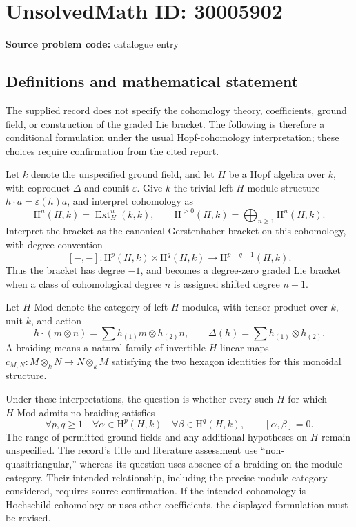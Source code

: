 \documentclass[11pt]{article}
\begin{document}
\section*{UnsolvedMath ID: 30005902}
\textbf{Source problem code:} catalogue entry
\subsection{Definitions and mathematical statement}
The supplied record does not specify the cohomology theory, coefficients, ground field, or construction of the graded Lie bracket. The following is therefore a conditional formulation under the usual Hopf-cohomology interpretation; these choices require confirmation from the cited report.

Let \(k\) denote the unspecified ground field, and let \(H\) be a Hopf algebra over \(k\), with coproduct \(\Delta\) and counit \(\varepsilon\). Give \(k\) the trivial left \(H\)-module structure \(h\cdot a=\varepsilon(h)a\), and interpret cohomology as
\[
\mathrm{H}^{n}(H,k)=\operatorname{Ext}^{n}_{H}(k,k),
\qquad
\mathrm{H}^{>0}(H,k)=\bigoplus_{n\geq 1}\mathrm{H}^{n}(H,k).
\]
Interpret the bracket as the canonical Gerstenhaber bracket on this cohomology, with degree convention
\[
[-,-]\colon \mathrm{H}^{p}(H,k)\times\mathrm{H}^{q}(H,k)
\longrightarrow \mathrm{H}^{p+q-1}(H,k).
\]
Thus the bracket has degree \(-1\), and becomes a degree-zero graded Lie bracket when a class of cohomological degree \(n\) is assigned shifted degree \(n-1\).

Let \(H\text{-}\mathrm{Mod}\) denote the category of left \(H\)-modules, with tensor product over \(k\), unit \(k\), and action
\[
h\cdot(m\otimes n)=\sum h_{(1)}m\otimes h_{(2)}n,
\qquad \Delta(h)=\sum h_{(1)}\otimes h_{(2)}.
\]
A braiding means a natural family of invertible \(H\)-linear maps \(c_{M,N}\colon M\otimes_k N\to N\otimes_k M\) satisfying the two hexagon identities for this monoidal structure.

Under these interpretations, the question is whether every such \(H\) for which \(H\text{-}\mathrm{Mod}\) admits no braiding satisfies
\[
\forall p,q\geq 1\quad
\forall \alpha\in\mathrm{H}^{p}(H,k)\quad
\forall \beta\in\mathrm{H}^{q}(H,k),
\qquad [\alpha,\beta]=0.
\]
The range of permitted ground fields and any additional hypotheses on \(H\) remain unspecified. The record's title and literature assessment use ``non-quasitriangular,'' whereas its question uses absence of a braiding on the module category. Their intended relationship, including the precise module category considered, requires source confirmation. If the intended cohomology is Hochschild cohomology or uses other coefficients, the displayed formulation must be revised.
\end{document}
